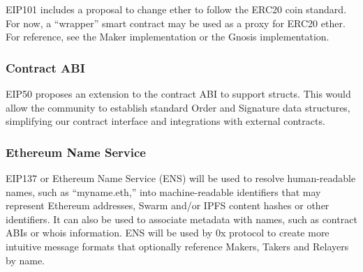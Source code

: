 \documentclass[conference]{IEEEtran}
\begin{document}
    EIP101 includes a proposal to change ether to follow the ERC20 coin standard. For now, a “wrapper” smart contract may be used as a proxy for ERC20 ether. For reference, see the Maker implementation or the Gnosis implementation.
    \subsubsection{Contract ABI}
    EIP50 proposes an extension to the contract ABI to support structs. This would allow the community to establish standard Order and Signature data structures, simplifying our contract interface and integrations with external contracts.
    \subsubsection{Ethereum Name Service}
    EIP137 or Ethereum Name Service (ENS) will be used to resolve human-readable names, such as “myname.eth,” into machine-readable identifiers that may represent Ethereum addresses, Swarm and/or IPFS content hashes or other identifiers. It can also be used to associate metadata with names, such as contract ABIs or whois information. ENS will be used by 0x protocol to create more intuitive message formats that optionally reference Makers, Takers and Relayers by name.
 
    
    
    
    
    

    \printbibliography
   
    
\end{document}
